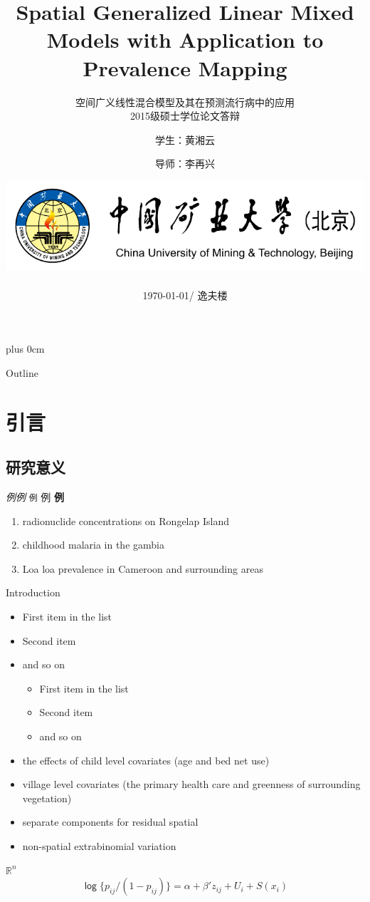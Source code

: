 \documentclass[10pt,aspectratio=43,compress,xcolor=x11names,UTF8]{beamer}
\title[Spatial Generalized Linear Mixed Models]{Spatial Generalized Linear Mixed Models with Application to Prevalence Mapping}
\subtitle{空间广义线性混合模型及其在预测流行病中的应用\\ 2015级硕士学位论文答辩}
\author[黄湘云 \and 李再兴]{学生：黄湘云 \and 导师：李再兴}
\institute[中国矿业大学（北京）] 
{
  专业：统计学\quad 方向：数据分析与统计计算 %
}
\date[\today] %
{\includegraphics[width=38ex,interpolate=true]{cumtb} \\ ~~\\
\today / 逸夫楼}
\renewcommand{\raggedright}{\leftskip=0pt \rightskip=0pt plus 0cm} %
\begin{document}
\raggedright

\maketitle

\begin{frame}{Outline}
\tableofcontents
\end{frame}

\section{引言}

\subsection{研究意义}

\begin{frame}{}
\emph{例}\textit{例} \texttt{例} \textsf{例} \textbf{例}
\begin{enumerate}
\item radionuclide concentrations on Rongelap Island
\item childhood malaria in the gambia
\item Loa loa prevalence in Cameroon and surrounding areas
\end{enumerate}

\end{frame}

\begin{frame}{Introduction}
\citet{Diggle2002}
\begin{itemize}
\item First item in the list
\item Second item
\item and so on
\begin{itemize}
\item First item in the list
\item Second item
\item and so on
\end{itemize}
\end{itemize}

\begin{itemize}
\item the effects of child level covariates (age and bed net use)
\item village level covariates (the primary health care and greenness of surrounding vegetation)
\item separate components for residual spatial
\item non-spatial extrabinomial variation
\end{itemize}
$\mathbb{R}^{n}$
$$ \mathsf{\log} \{p_{ij}/(1-p_{ij})\} =\alpha + \beta'z_{ij} + U_{i} + S(x_{i})$$

\end{frame}
\end{document}
